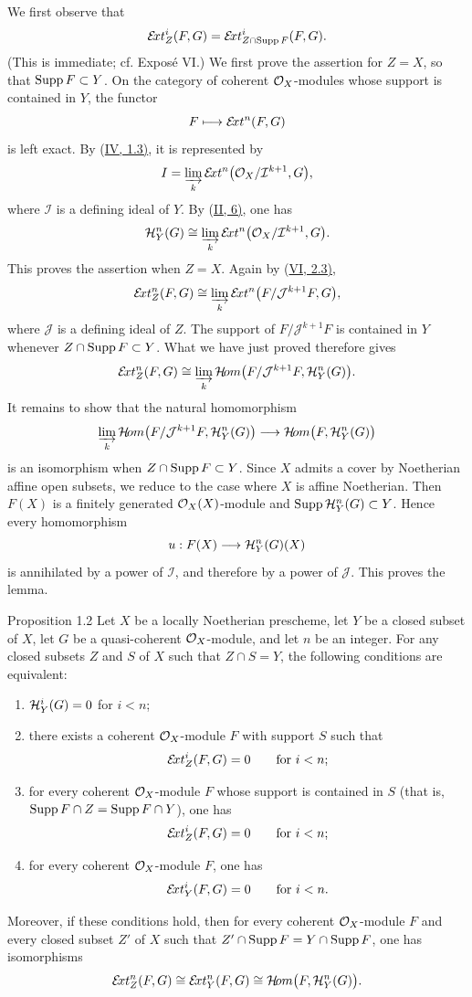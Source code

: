 We first observe that
\[
  \mathcal E\!xt_Z^i(F,G)
  =\mathcal E\!xt_{Z\cap\operatorname{Supp} F}^i(F,G).
\]
(This is immediate; cf. Expos\'e VI.) We first prove the assertion for
$Z=X$, so that $\operatorname{Supp} F\subset Y$. On the category of coherent $\mathcal O_X$-modules
whose support is contained in $Y$, the functor
\[
  F\longmapsto\mathcal E\!xt^n(F,G)
\]
is left exact. By (\hyperref[IV.1.3]{IV, 1.3)}, it is represented by
\[
  I=\varinjlim_k\mathcal E\!xt^n
    \bigl(\mathcal O_X/\mathcal I^{k+1},G\bigr),
\]
where $\mathcal I$ is a defining ideal of $Y$. By (\hyperref[II.6]{II, 6)}, one has
\[
  \mathcal H_Y^n(G)\cong
  \varinjlim_k\mathcal E\!xt^n
    \bigl(\mathcal O_X/\mathcal I^{k+1},G\bigr).
\]
This proves the assertion when $Z=X$. Again by (\hyperref[VI.2.3]{VI, 2.3)},
\[
  \mathcal E\!xt_Z^n(F,G)\cong
  \varinjlim_k\mathcal E\!xt^n
    \bigl(F/\mathcal J^{k+1}F,G\bigr),
\]
where $\mathcal J$ is a defining ideal of $Z$. The support of
$F/\mathcal J^{k+1}F$ is contained in $Y$ whenever
$Z\cap\operatorname{Supp} F\subset Y$. What we have just proved therefore gives
\[
  \mathcal E\!xt_Z^n(F,G)\cong
  \varinjlim_k\mathcal H\!om
    \bigl(F/\mathcal J^{k+1}F,\mathcal H_Y^n(G)\bigr).
\]
It remains to show that the natural homomorphism
\[
  \varinjlim_k\mathcal H\!om
    \bigl(F/\mathcal J^{k+1}F,\mathcal H_Y^n(G)\bigr)
  \longrightarrow
  \mathcal H\!om\bigl(F,\mathcal H_Y^n(G)\bigr)
\]
is an isomorphism when $Z\cap\operatorname{Supp} F\subset Y$. Since $X$ admits a cover by
Noetherian affine open subsets, we reduce to the case where $X$ is affine
Noetherian. Then $F(X)$ is a finitely generated $\mathcal O_X(X)$-module and
$\operatorname{Supp}\mathcal H_Y^n(G)\subset Y$. Hence every homomorphism
\[
  u:F(X)\longrightarrow\mathcal H_Y^n(G)(X)
\]
is annihilated by a power of $\mathcal I$, and therefore by a power of
$\mathcal J$. This proves the lemma.

\begin{sgastatement}{Proposition 1.2}
Let $X$ be a locally Noetherian prescheme, let $Y$ be a closed subset of $X$,
let $G$ be a quasi-coherent $\mathcal O_X$-module, and let $n$ be an integer. For any
closed subsets $Z$ and $S$ of $X$ such that $Z\cap S=Y$, the following
conditions are equivalent:
\begin{enumerate}
  \renewcommand{\labelenumi}{(\roman{enumi})}
  \item $\mathcal H_Y^i(G)=0$ for $i<n$;
  \item there exists a coherent $\mathcal O_X$-module $F$ with support $S$ such that
  \[
    \mathcal E\!xt_Z^i(F,G)=0\qquad\text{for }i<n;
  \]
  \item for every coherent $\mathcal O_X$-module $F$ whose support is contained in $S$
  (that is, $\operatorname{Supp} F\cap Z=\operatorname{Supp} F\cap Y$), one has
  \[
    \mathcal E\!xt_Z^i(F,G)=0\qquad\text{for }i<n;
  \]
  \item for every coherent $\mathcal O_X$-module $F$, one has
  \[
    \mathcal E\!xt_Y^i(F,G)=0\qquad\text{for }i<n.
  \]
\end{enumerate}
Moreover, if these conditions hold, then for every coherent $\mathcal O_X$-module $F$
and every closed subset $Z'$ of $X$ such that
$Z'\cap\operatorname{Supp} F=Y\cap\operatorname{Supp} F$, one has isomorphisms
\[
  \mathcal E\!xt_Z^n(F,G)\cong
  \mathcal E\!xt_Y^n(F,G)\cong
  \mathcal H\!om\bigl(F,\mathcal H_Y^n(G)\bigr).
\]
\end{sgastatement}

